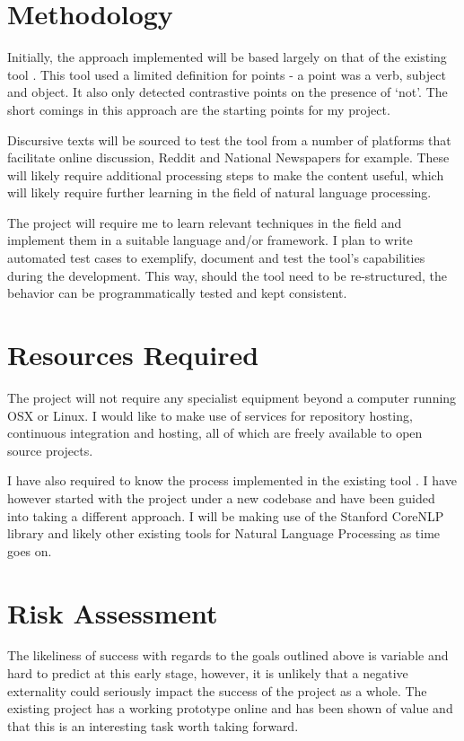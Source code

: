 \documentclass[tikz]{article}
\begin{document}
  \section{Methodology}
    Initially, the approach implemented will be based largely on that of the existing tool \citep{existing}. This tool used a limited definition for points - a point was a verb, subject and object. It also only detected contrastive points on the presence of `not'. The short comings in this approach are the starting points for my project.

      Discursive texts will be sourced to test the tool from a number of platforms that facilitate online discussion, Reddit and National Newspapers for example. These will likely require additional processing steps to make the content useful, which will likely require further learning in the field of natural language processing.

      The project will require me to learn relevant techniques in the field and implement them in a suitable language and/or framework. I plan to write automated test cases to exemplify, document and test the tool's capabilities during the development. This way, should the tool need to be re-structured, the behavior can be programmatically tested and kept consistent.

  \section{Resources Required}
    The project will not require any specialist equipment beyond a computer running OSX or Linux. I would like to make use of services for repository hosting, continuous integration and hosting, all of which are freely available to open source projects.

    I have also required to know the process implemented in the existing tool \citep{existing}. I have however started with the project under a new codebase and have been guided into taking a different approach. I will be making use of the Stanford CoreNLP \cite{corenlp} library and likely other existing tools for Natural Language Processing as time goes on.

  \section{Risk Assessment}
    The likeliness of success with regards to the goals outlined above is variable and hard to predict at this early stage, however, it is unlikely that a negative externality could seriously impact the success of the project as a whole. The existing project has a working prototype \citep{existing} online and has been shown of value and that this is an interesting task worth taking forward.
\end{document}
